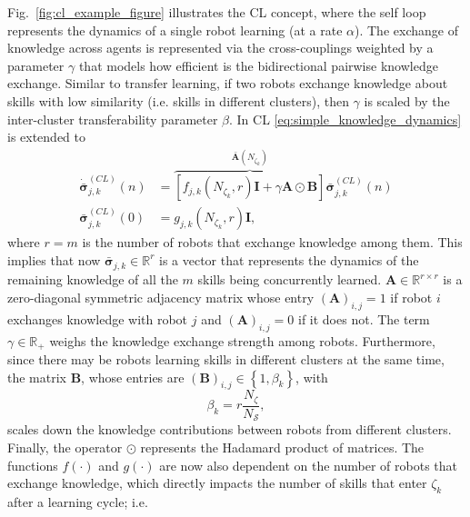 Fig.~\ref{fig:cl_example_figure} illustrates the CL concept, where the self loop represents the dynamics of a single robot learning (at a rate $\alpha$). The exchange of knowledge across agents is represented via the cross-couplings weighted by a parameter $\gamma$ that models how efficient is the bidirectional pairwise knowledge exchange. Similar to transfer learning, if two robots exchange knowledge about skills with low similarity (i.e. skills in different clusters), then $\gamma$ is scaled by the inter-cluster transferability parameter $\beta$. In CL \eqref{eq:simple_knowledge_dynamics} is extended to 
\begin{subequations}\label{eq:collective_knowledge_dynamics}
	\begin{alignat}{2}
		\dot{\bar{\bm{\sigma}}}^{(CL)}_{j,k}\left(n\right) &= \overbrace{\left[  f_{j,k}\left(N_{\zeta_k},r\right) \bm{I} + \gamma \bm{A} \odot \bm{B}  \right]}^{\bar{\bm{A}}\left(N_{\zeta_k}\right)} \bar{\bm{\sigma}}^{(CL)}_{j,k}\left(n\right)\\
		\bar{\bm{\sigma}}^{(CL)}_{j,k}(0) &= g_{j,k}\left( N_{\zeta_k}, r\right) \bm{I},
	\end{alignat}
\end{subequations}
where $r=m$ is the number of robots that exchange knowledge among them. This implies that now $\bar{\bm{\sigma}}^{}_{j,k} \in \mathbb{R}^r$ is a vector that represents the dynamics of the remaining knowledge of all the $m$ skills being concurrently learned. $\bm{A} \in \mathbb{R}^{r \times r}$ is a zero-diagonal symmetric adjacency matrix whose entry $(\bm{A})_{i,j} = 1$ if robot $i$ exchanges knowledge with robot $j$ and $(\bm{A})_{i,j} = 0$ if it does not. The term $\gamma \in \mathbb{R}_+ $ weighs the knowledge exchange strength among robots. Furthermore, since there may be robots learning skills in different clusters at the same time, the matrix $\bm{B}$, whose entries are $\left(\bm{B}\right)_{i,j} \in \left \lbrace 1, \beta_{k} \right \rbrace$, with
\begin{equation}
	\beta_{k} = r\frac{ N_\zeta}{N_\mathcal{S}}, 
\end{equation}
scales down the knowledge contributions between robots from different clusters. Finally, the operator $\odot$ represents the Hadamard product of matrices. The functions $ f(\cdot)$ and $g(\cdot)$ are now also dependent on the number of robots that exchange knowledge, which directly impacts the number of skills that enter $\zeta_k$ after a learning cycle; i.e.
